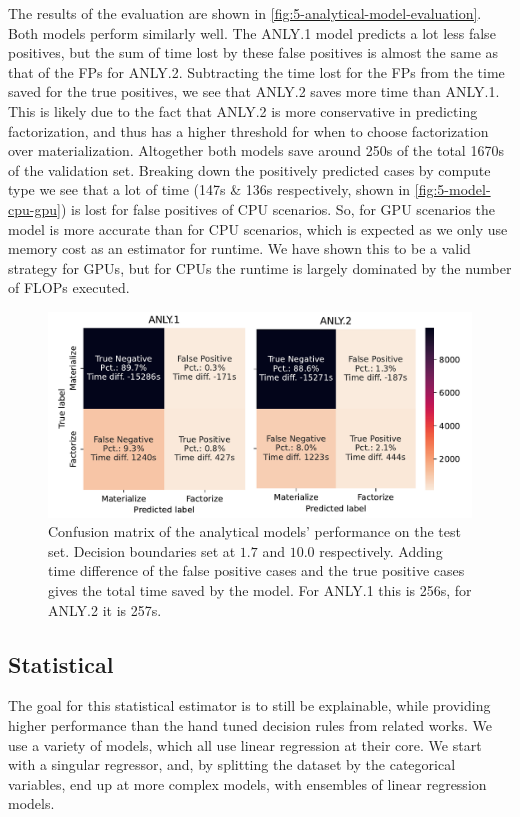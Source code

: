 The results of the evaluation are shown in \autoref{fig:5-analytical-model-evaluation}. Both models perform similarly well. The ANLY.1 model predicts a lot less false positives, but the sum of time lost by these false positives is almost the same as that of the FPs for ANLY.2. Subtracting the time lost for the FPs from the time saved for the true positives, we see that ANLY.2 saves more time than ANLY.1. This is likely due to the fact that ANLY.2 is more conservative in predicting factorization, and thus has a higher threshold for when to choose factorization over materialization. Altogether both models save around 250s of the total 1670s of the validation set. Breaking down the positively predicted cases by compute type we see that a lot of time (147s \& 136s respectively, shown in \autoref{fig:5-model-cpu-gpu}) is lost for false positives of CPU scenarios. So, for GPU scenarios the model is more accurate than for CPU scenarios, which is expected as we only use memory cost as an estimator for runtime. We have shown this to be a valid strategy for GPUs, but for CPUs the runtime is largely dominated by the number of FLOPs executed.

\begin{figure}[ht]
    \centering
    \includegraphics[width=0.9\linewidth]{chapters/05_cost_estimation/figures/analytical-models-compare.pdf}
    \caption[Analytical Model Confusion Matrix]{Confusion matrix of the analytical models' performance on the test set. Decision boundaries set at $1.7$ and $10.0$ respectively. Adding time difference of the false positive cases and the true positive cases gives the total time saved by the model. For ANLY.1 this is 256s, for ANLY.2 it is 257s. }
    \label{fig:5-analytical-model-evaluation}
\end{figure}


\subsection{Statistical}
\label{subsec:5-statistical}
The goal for this statistical estimator is to still be explainable, while providing higher performance than the hand tuned decision rules from related works. We use a variety of models, which all use linear regression at their core. We start with a singular regressor, and, by splitting the dataset by the categorical variables, end up at more complex models, with ensembles of linear regression models.

